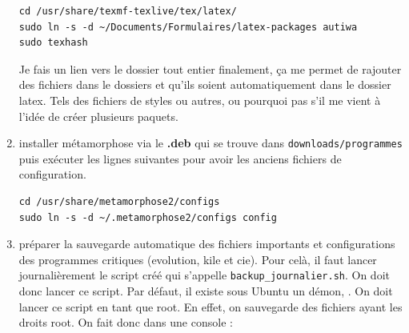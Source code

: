 \documentclass[a4paper,twoside]{article}
\begin{document}
\begin{enumerate}
\begin{verbatim}
cd /usr/share/texmf-texlive/tex/latex/
sudo ln -s -d ~/Documents/Formulaires/latex-packages autiwa
sudo texhash
\end{verbatim}

\begin{remarque}
Je fais un lien vers le dossier tout entier finalement, ça me permet de rajouter des fichiers dans le dossiers et qu'ils soient automatiquement dans le dossier latex. Tels des fichiers de styles ou autres, ou pourquoi pas s'il me vient à l'idée de créer plusieurs paquets.
\end{remarque}
\item installer métamorphose via le \textbf{.deb} qui se trouve dans \texttt{downloads/programmes} puis exécuter les lignes suivantes pour avoir les anciens fichiers de configuration.
\begin{verbatim}
cd /usr/share/metamorphose2/configs
sudo ln -s -d ~/.metamorphose2/configs config
\end{verbatim}
\item préparer la sauvegarde automatique des fichiers importants et configurations des programmes critiques (evolution, kile et cie). Pour celà, il faut lancer journalièrement le script créé qui s'appelle \texttt{backup\_journalier.sh}. On doit donc lancer ce script. Par défaut, il existe sous Ubuntu un démon, . On doit lancer ce script en tant que root. En effet, on sauvegarde des fichiers ayant les droits root. On fait donc dans une console :

%


\end{enumerate}
\end{document}
